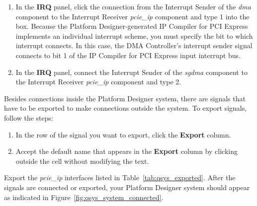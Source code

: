 \documentclass[11pt, twoside, pdftex]{article}
\begin{document}
\begin{enumerate}
	\item In the {\bf IRQ} panel, click the connection from the Interrupt Sender of the {\it dma} component to the Interrupt Receiver {\it pcie\_ip} component and type 1 into the box. Because the Platform Designer-generated IP Compiler for PCI Express implements an individual interrupt scheme, you must specify the bit to which interrupt connects. In this case, the DMA Controller's interrupt sender signal connects to bit 1 of the IP Compiler for PCI Express input interrupt bus. 
	\item In the {\bf IRQ} panel, connect the Interrupt Sender of the {\it sgdma} component to the Interrupt Receiver {\it pcie\_ip} component and type 2. 
	
\end{enumerate}

Besides connections inside the Platform Designer system, there are signals that have to be exported to make connections outside the system. To export signals, follow the steps: 

\begin{enumerate}
	\item In the row of the signal you want to export, click the {\bf Export} column.
	\item Accept the default name that appears in the {\bf Export} column by clicking outside the cell without modifying the text.
\end{enumerate}

Export the {\it pcie\_ip} interfaces listed in Table~\ref{tab:qsys_exported}. After the signals are connected or exported, your Platform Designer system should appear as indicated in Figure~\ref{fig:qsys_system_connected}.
\end{document}

